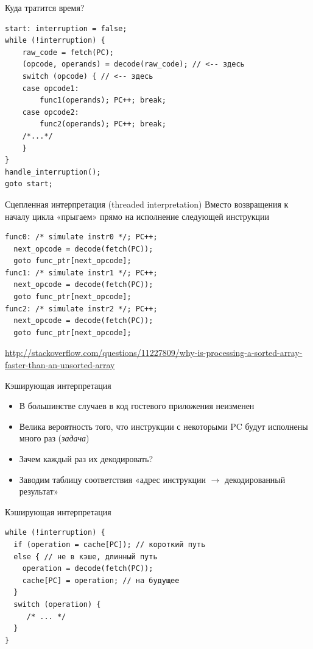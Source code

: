 \documentclass{beamer}
\begin{document}
\begin{frame}[fragile]{Куда тратится время?}
\begin{verbatim}
start: interruption = false;
while (!interruption) {
    raw_code = fetch(PC);
    (opcode, operands) = decode(raw_code); // <-- здесь
    switch (opcode) { // <-- здесь
    case opcode1:
        func1(operands); PC++; break;
    case opcode2:
        func2(operands); PC++; break;
    /*...*/
    }
}
handle_interruption();
goto start;
\end{verbatim}
\end{frame}

\begin{frame}[fragile]{Сцепленная интерпретация (threaded interpretation)}
Вместо возвращения к началу цикла «прыгаем» прямо на исполнение следующей инструкции
\begin{verbatim}
func0: /* simulate instr0 */; PC++;
  next_opcode = decode(fetch(PC));
  goto func_ptr[next_opcode];
func1: /* simulate instr1 */; PC++;
  next_opcode = decode(fetch(PC));
  goto func_ptr[next_opcode];
func2: /* simulate instr2 */; PC++;
  next_opcode = decode(fetch(PC));
  goto func_ptr[next_opcode];
\end{verbatim}

\tiny\url{http://stackoverflow.com/questions/11227809/why-is-processing-a-sorted-array-faster-than-an-unsorted-array}
\end{frame}

\begin{frame}{Кэширующая интерпретация}
\begin{itemize}
\item В большинстве случаев в код гостевого приложения неизменен
\item Велика вероятность того, что инструкции с некоторыми PC будут исполнены много раз (\textit{задача})
\item Зачем каждый раз их декодировать?
\item Заводим таблицу соответствия «адрес инструкции $\rightarrow$ декодированный результат» 
\end{itemize}

\end{frame}

\begin{frame}[fragile]{Кэширующая интерпретация}
\begin{verbatim}
while (!interruption) {
  if (operation = cache[PC]); // короткий путь
  else { // не в кэше, длинный путь
  	operation = decode(fetch(PC));
  	cache[PC] = operation; // на будущее
  }
  switch (operation) {
     /* ... */
  }
}
\end{verbatim}


\end{frame}
\end{document}

